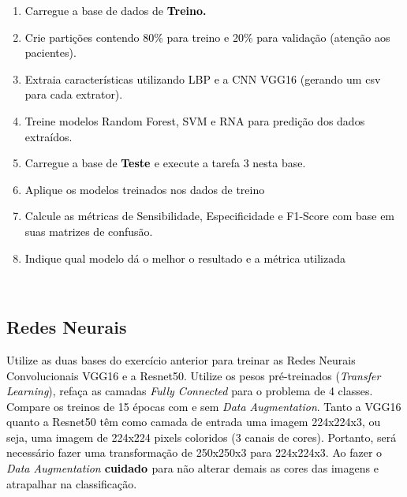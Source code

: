 \begin{enumerate}[series=listWWNumxxiv,label=\alph*),ref=\alph*]
\item \textcolor{black}{Carregue a base de dados de }\textbf{\textcolor{black}{Treino.}}\textcolor{black}{ }
\item \textcolor{black}{Crie partições contendo 80\% para treino e 20\% para validação (atenção aos
pacientes).}\textcolor{black}{ }
\item \textcolor{black}{Extraia características utilizando LBP e a CNN VGG16 (gerando um csv para cada
extrator).}\textcolor{black}{ }
\item \textcolor{black}{Treine modelos Random Forest, SVM e RNA para predição dos dados extraídos.}\textcolor{black}{ }
\item \textcolor{black}{Carregue a base de }\textbf{\textcolor{black}{Teste }}\textcolor{black}{ e execute a tarefa 3
nesta base.}\textcolor{black}{ }
\item \textcolor{black}{Aplique os modelos treinados nos dados de treino}\textcolor{black}{ }
\item \textcolor{black}{Calcule as métricas de Sensibilidade, Especificidade e F1-Score com base em suas matrizes de
confusão.}\textcolor{black}{ }
\item \textcolor{black}{Indique qual modelo dá o melhor o resultado e a métrica utilizada}\textcolor{black}{ }
\end{enumerate}
\textcolor{black}{ }

\subsection{Redes Neurais}

\textcolor{black}{Utilize as duas bases do exercício anterior para treinar as Redes Neurais Convolucionais VGG16 e a
Resnet50. Utilize os pesos pré-treinados (}\textit{\textcolor{black}{Transfer Learning}}\textcolor{black}{), refaça as
camadas }\textit{\textcolor{black}{Fully Connected}}\textcolor{black}{ para o problema de 4 classes. Compare os treinos
de 15 épocas com e sem }\textit{\textcolor{black}{Data Augmentation}}\textcolor{black}{. Tanto a VGG16 quanto a
Resnet50 têm como camada de entrada uma imagem 224x224x3, ou seja, uma imagem de 224x224 pixels coloridos (3 canais de
cores). Portanto, será necessário fazer uma transformação de 250x250x3 para 224x224x3. Ao fazer o
}\textit{\textcolor{black}{Data Augmentation }}\textbf{\textit{\textcolor{black}{
}}}\textbf{\textcolor{black}{ cuidado }}\textcolor{black}{ para não alterar demais as cores das imagens e atrapalhar na
classificação.}\textcolor{black}{ }

